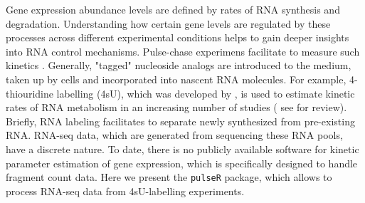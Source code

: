 Gene expression abundance levels are defined by rates of RNA synthesis and degradation.
Understanding how certain gene levels are regulated by these processes across different
experimental conditions helps to gain deeper insights into RNA control mechanisms.
Pulse-chase experimens facilitate to measure such kinetics \citep{Wachutka2016}. 
Generally, "tagged" nucleoside analogs are introduced to the medium, 
taken up by cells and incorporated into nascent RNA molecules.
For example, 4-thiouridine labelling (4sU), which was developed by \cite{dolken2008high}, is used to estimate 
kinetic rates of RNA metabolism in an increasing number of studies ( 
see \cite{Wachutka2016} for review). Briefly, RNA labeling facilitates to separate newly synthesized from pre-existing RNA.
RNA-seq data, which are generated from sequencing these RNA pools, have a discrete nature.
To date, there is no publicly available software for kinetic parameter estimation of gene expression, which is specifically designed to handle 
fragment count data. Here we present the \verb|pulseR| package, which allows to 
process RNA-seq data from 4sU-labelling experiments.
